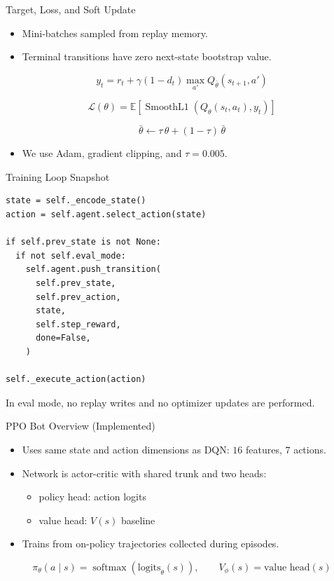 \documentclass[12pt,aspectratio=169]{beamer}
\begin{document}
\begin{frame}{Target, Loss, and Soft Update}
\begin{itemize}
  \item Mini-batches sampled from replay memory.
  \item Terminal transitions have zero next-state bootstrap value.
\end{itemize}

\[
y_t = r_t + \gamma (1-d_t) \max_{a'} Q_{\bar\theta}(s_{t+1},a')
\]

\[
\mathcal{L}(\theta)=\mathbb{E}\left[\operatorname{SmoothL1}\left(Q_\theta(s_t,a_t),y_t\right)\right]
\]

\[
\bar\theta \leftarrow \tau\,\theta + (1-\tau)\,\bar\theta
\]

\begin{itemize}
  \item We use Adam, gradient clipping, and $\tau=0.005$.
\end{itemize}
\end{frame}

\begin{frame}[fragile]{Training Loop Snapshot}
\begin{lstlisting}[style=pycode]
state = self._encode_state()
action = self.agent.select_action(state)

if self.prev_state is not None:
  if not self.eval_mode:
    self.agent.push_transition(
      self.prev_state,
      self.prev_action,
      state,
      self.step_reward,
      done=False,
    )

self._execute_action(action)
\end{lstlisting}
\vspace{0.1cm}
\small In eval mode, no replay writes and no optimizer updates are performed.
\end{frame}

\begin{frame}{PPO Bot Overview (Implemented)}
\begin{itemize}
  \item Uses same state and action dimensions as DQN: $16$ features, $7$ actions.
  \item Network is actor-critic with shared trunk and two heads:
  \begin{itemize}
    \item policy head: action logits
    \item value head: $V(s)$ baseline
  \end{itemize}
  \item Trains from on-policy trajectories collected during episodes.
\end{itemize}

\[
\pi_\theta(a\mid s)=\operatorname{softmax}(\text{logits}_\theta(s)),\qquad
V_\phi(s)=\text{value head}(s)
\]
\end{frame}
\end{document}
